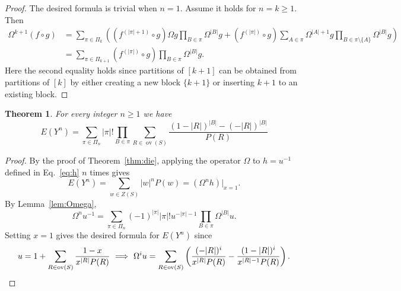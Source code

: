 \documentclass[10pt]{amsart}
\newtheorem{theorem}{Theorem}[section]
\theoremstyle{definition}
\theoremstyle{remark}
\DeclareMathOperator{\overlap}{ov}
\begin{document}
\begin{proof}
The desired formula is trivial when $n=1$. 
Assume it holds for $n=k\ge1$.
Then
\begin{align*}
\Omega^{k+1} (f\circ g) &= 
\sum_{\pi\in\Pi_k} \left( \left( f^{(|\pi|+1)}\circ g \right) \Omega g \prod_{B\in \pi} \Omega^{|B|}g
+ \left( f^{(|\pi|)}\circ g \right) \sum_{A \in \pi} \Omega^{|A|+1}g \prod_{B\in \pi\setminus\{A\}} \Omega^{|B|}g \right) \\
&= \sum_{\pi\in\Pi_{k+1}} \left( f^{(|\pi|)}\circ g \right) \prod_{B\in \pi} \Omega^{|B|}g.
\end{align*}
Here the second equality holds since partitions of $[k+1]$ can be obtained from partitions of $[k]$ by either creating a new block $\{k+1\}$ or inserting $k+1$ to an existing block.
\end{proof}

\begin{theorem}\label{thm:moment}
For every integer $n\ge1$ we have 
\[ 
E(Y^n) = \sum_{\pi\in\Pi_n} |\pi|! \prod_{B\in \pi} \sum_{R\in\overlap(S)} \frac{(1-|R|)^{|B|} - (-|R|)^{|B|}}{P(R)}
\]
\end{theorem}

\begin{proof}
By the proof of Theorem~\ref{thm:die}, applying the operator $\Omega$ to $h=u^{-1}$ defined in Eq.~\eqref{eq:h} $n$ times gives
\[ E(Y^n) = \sum_{w\in Z(S)} |w|^n P(w) = \left(\Omega^n h\right)|_{x=1}.
\]
By Lemma~\ref{lem:Omega},
\[ 
\Omega^n u^{-1} = 
\sum_{\pi\in\Pi_n} (-1)^{|\pi|} |\pi|! u^{-|\pi|-1}
\prod_{B\in \pi} \Omega^{|B|}u.
\]
Setting $x=1$ gives the desired formula for $E(Y^n)$ since
\[ u = 1 + \sum_{R\in\overlap(S)} \frac{1-x}{x^{|R|} P(R)} \ \Longrightarrow \ 
\Omega^i u = \sum_{R\in\overlap(S)} \left( \frac{(-|R|)^i}{x^{|R|} P(R)} - \frac{(1-|R|)^i}{x^{|R|-1} P(R)} \right).
\qedhere \]
\end{proof}
\end{document}

